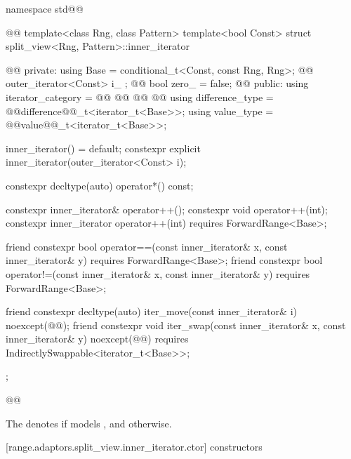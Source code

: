 \begin{codeblock}
namespace std@@ { @@
  template<class Rng, class Pattern>
  template<bool Const>
  struct split_view<Rng, Pattern>::inner_iterator {    @\newtxt{// \expos}@
  private:
    using Base = conditional_t<Const, const Rng, Rng>; @\newtxt{// \expos}@
    outer_iterator<Const> i_ {};                       @\newtxt{// \expos}@
    bool zero_ = false;                                @\newtxt{// \expos}@
  public:
    using iterator_category = @\newtxt{\seebelownc;}@
      @@
    @@
      @@
    using difference_type = @@difference@@_t<iterator_t<Base>>;
    using value_type = @@value@@_t<iterator_t<Base>>;

    inner_iterator() = default;
    constexpr explicit inner_iterator(outer_iterator<Const> i);

    constexpr decltype(auto) operator*() const;

    constexpr inner_iterator& operator++();
    constexpr void operator++(int);
    constexpr inner_iterator operator++(int) requires ForwardRange<Base>;

    friend constexpr bool operator==(const inner_iterator& x, const inner_iterator& y)
      requires ForwardRange<Base>;
    friend constexpr bool operator!=(const inner_iterator& x, const inner_iterator& y)
      requires ForwardRange<Base>;

    friend constexpr decltype(auto) iter_move(const inner_iterator& i)
      noexcept(@\oldtxt{\seebelow}@);
    friend constexpr void iter_swap(const inner_iterator& x, const inner_iterator& y)
      noexcept(@\oldtxt{\seebelow}@)
      requires IndirectlySwappable<iterator_t<Base>>;
  };
}@\oldtxt{\}}@
\end{codeblock}

{\color{newclr}
\pnum
The   denotes
 if
 models
, and 
otherwise.
} %

[range.adaptors.split_view.inner_iterator.ctor]{ constructors}

